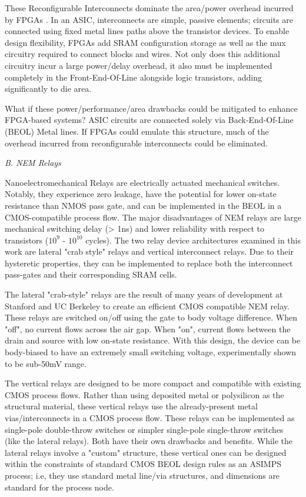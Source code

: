 \documentclass[twoside,twocolumn]{article}
\begin{document}
These Reconfigurable Interconnects dominate the area/power overhead incurred by FPGAs \cite{ALTERA}. In an ASIC, interconnects are simple, passive elements; circuits are connected using fixed metal lines paths above the transistor devices. To enable design flexibility, FPGAs add SRAM configuration storage as well as the mux circuitry required to connect blocks and wires. Not only does this additional circuitry incur a large power/delay overhead, it also must be implemented completely in the Front-End-Of-Line alongside logic transistors, adding significantly to die area.

What if these power/performance/area drawbacks could be mitigated to enhance FPGA-based systems? ASIC circuits are connected solely via Back-End-Of-Line (BEOL) Metal lines. If FPGAs could emulate this structure, much of the overhead incurred from reconfigurable interconnects could be eliminated.

\textit{B. NEM Relays}

Nanoelectromechanical Relays are electrically actuated mechanical switches. Notably, they experience zero leakage, have the potential for lower on-state resistance than NMOS pass gate, and can be implemented in the BEOL in a CMOS-compatible process flow\cite{LIU}. The major disadvantages of NEM relays are large mechanical switching delay (> 1ns)\cite{chen_integrated_2008} and lower reliability with respect to transistors ($10^9$ - $10^{10}$ cycles). The two relay device architectures examined in this work are lateral "crab style" relays and vertical interconnect relays. Due to their hysteretic properties, they can be implemented to replace both the interconnect pass-gates and their corresponding SRAM cells.

The lateral "crab-style" relays are the result of many years of development at Stanford and UC Berkeley to create an efficient CMOS compatible NEM relay\cite{LIU}. These relays are switched on/off using the gate to body voltage difference. When "off", no current flows across the air gap. When "on", current flows between the drain and source with low on-state resistance. With this design, the device can be body-biased to have an extremely small switching voltage, experimentally shown to be sub-50mV range.

The vertical relays are designed to be more compact and compatible with existing CMOS process flows. Rather than using deposited metal or polysilicon as the structural material, these vertical relays use the already-present metal vias/interconnects in a CMOS process flow\cite{SIKDER}. These relays can be implemented as single-pole double-throw switches or simpler single-pole single-throw switches (like the lateral relays). Both have their own drawbacks and benefits. While the lateral relays involve a "custom" structure, these vertical ones can be designed within the constraints of standard CMOS BEOL design rules as an ASIMPS process; i.e, they use standard metal line/via structures, and dimensions are standard for the process node.
\end{document}
